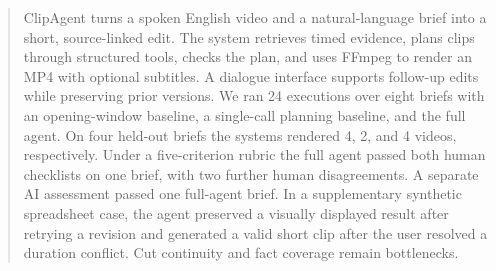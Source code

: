 \begin{abstract}
ClipAgent turns a spoken English video and a natural-language brief into a short, source-linked edit. The system retrieves timed evidence, plans clips through structured tools, checks the plan, and uses FFmpeg to render an MP4 with optional subtitles. A dialogue interface supports follow-up edits while preserving prior versions. We ran 24 executions over eight briefs with an opening-window baseline, a single-call planning baseline, and the full agent. On four held-out briefs the systems rendered 4, 2, and 4 videos, respectively. Under a five-criterion rubric the full agent passed both human checklists on one brief, with two further human disagreements. A separate AI assessment passed one full-agent brief. In a supplementary synthetic spreadsheet case, the agent preserved a visually displayed result after retrying a revision and generated a valid short clip after the user resolved a duration conflict. Cut continuity and fact coverage remain bottlenecks.
\end{abstract}

